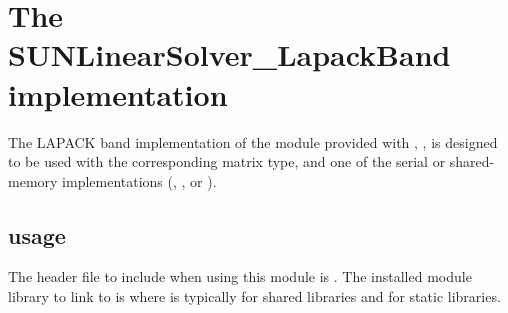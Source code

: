 \section{The SUNLinearSolver\_LapackBand implementation}\label{ss:sunlinsol_lapband}

The LAPACK band implementation of the {\sunlinsol} module provided
with {\sundials}, {\sunlinsollapband}, is designed to be used with the
corresponding {\sunmatband} matrix type, and one of the serial or
shared-memory {\nvector} implementations ({\nvecs}, {\nvecopenmp}, or
{\nvecpthreads}).

\subsection{{\sunlinsollapband} usage}\label{ss:sunlinsol_lapband_usage}

The header file to include when using this module 
is . The installed module
library to link to is
where  is typically  for shared libraries and
 for static libraries.

